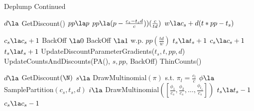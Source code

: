\begin{algorithm}
	\begin{algorithmic}[1]
	\caption{Deplump Continued}
	
		\State $d \la $ GetDiscount(\N)
		\State $pp \la p$
			\State $pp \la (p - \frac{c_s - t_s d}{c}))(\frac{c}{t d})$
			\State $w \la c_s	+ d(t *pp - t_s)$		
		\EndIf
		
			\State $c_s \la c_s + 1$
			\State BackOff $\la 0$
			\State BackOff $\la 1$ w.p. $pp (\frac{t d}{w})$ 
				\State $t_s \la t_s + 1$
			 \EndIf
				\State $c_s \la c_s + 1$
				\State $t_s \la t_s + 1$
		\EndIf
		\State UpdateDiscountParameterGradients($t_s, t,pp, d$)
		\State UpdateCountsAndDiscounts(PA(\N), $s,pp$, BackOff)
		\State ThinCounts(\N)
	\EndFunction
			
		\State $d \la$ GetDiscount$(\N)$
			\State $s \la $ DrawMultinomial$(\pi)$ s.t. $\pi_l = \frac{c_l}{c}$ 
			\State $\phi \la$ SamplePartition$(c_s, t_s, d)$
			\State $i \la$ DrawMultinomial$([\frac{\phi_1}{c_s}, \frac{\phi_2}{c_s}, \ldots, \frac{\phi_{t_s }}{c_s} ])$
				\State $t_s \la t_s - 1$
			\EndIf
			\State $c_s \la c_s - 1$
		\EndWhile
	\EndFunction	
	
	\end{algorithmic}	
\end{algorithm}

